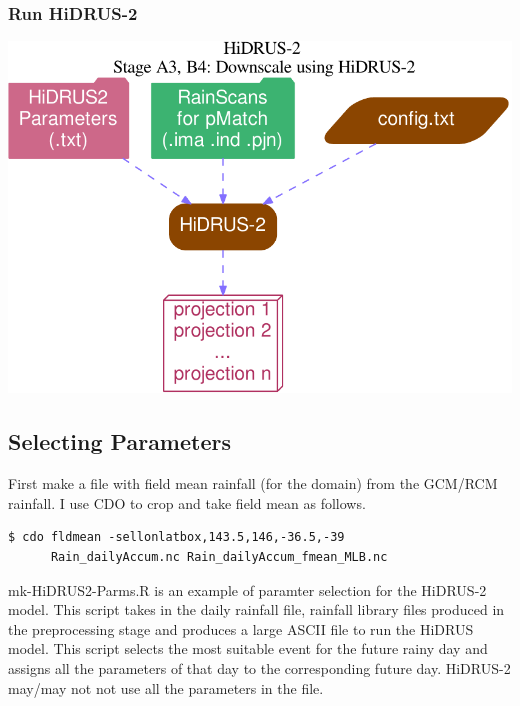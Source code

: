 \documentclass[12pt, a4paper]{extarticle}
\begin{document}
\subsubsection{Run HiDRUS-2}
\includegraphics[width=6in]{./fig/runH2.pdf}

\subsection{Selecting Parameters}
First make a file with field mean rainfall (for the domain) from the GCM/RCM rainfall. 
I use CDO to crop and take field mean as follows.

\begin{lstlisting}[style=BashInputStyle]
	$ cdo fldmean -sellonlatbox,143.5,146,-36.5,-39 
	  Rain_dailyAccum.nc Rain_dailyAccum_fmean_MLB.nc
\end{lstlisting}

mk-HiDRUS2-Parms.R is an example of paramter selection for the HiDRUS-2 model. This script takes in the daily rainfall file, rainfall library files produced in the preprocessing stage and produces a large ASCII file to run the HiDRUS model. This script selects the most suitable event for the future rainy day and assigns all the parameters of that day to the corresponding future day.
HiDRUS-2 may/may not not use all the parameters in the file.




\end{document}
